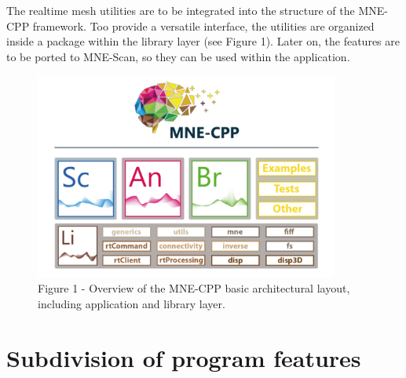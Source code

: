 \documentclass[a4paper, 11pt, english, fleqn]{article}
\begin{document}
The realtime mesh utilities are to be integrated into the structure of the MNE-CPP framework. Too provide a versatile interface, the utilities are organized inside a package within the library layer (see Figure 1). Later on, the features are to be ported to MNE-Scan, so they can be used within the application.
\begin{figure}[h]
	\begin{center}
		\includegraphics[width=10cm]{figures/mne_architecture.png}
		\caption{Figure 1 - Overview of the MNE-CPP basic architectural layout, including application and library layer.}
	\end{center}
\end{figure}

\clearpage

\section{Subdivision of program features}
\end{document}
